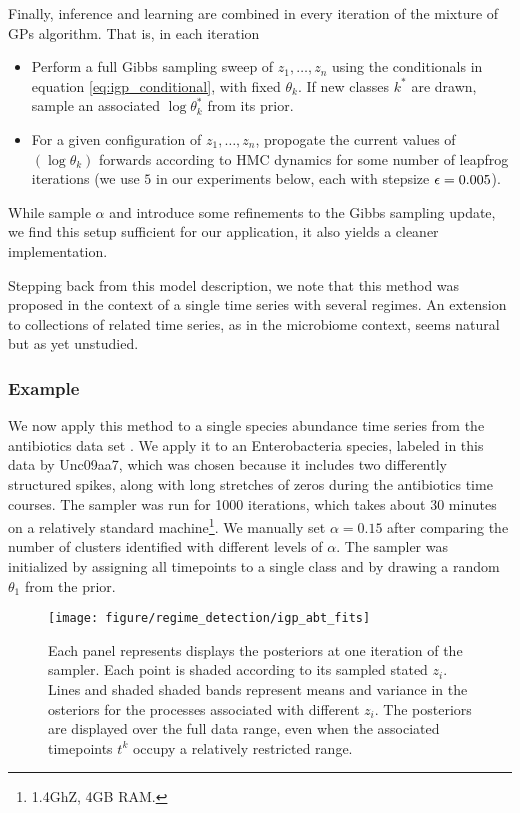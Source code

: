 Finally, inference and learning are combined in every iteration of the mixture
of GPs algorithm. That is, in each iteration
\begin{itemize}
\item Perform a full Gibbs sampling sweep of $z_1, \dots, z_n$ using the
  conditionals in equation \ref{eq:igp_conditional}, with fixed $\theta_k$. If
  new classes $k^\ast$ are drawn, sample an associated $\log \theta_k^\ast$ from
  its prior.
\item For a given configuration of $z_1, \dots, z_n$, propogate the current
  values of $\left(\log \theta_k\right)$ forwards according to HMC dynamics for
  some number of leapfrog iterations (we use $5$ in our experiments below, each
  with stepsize $\epsilon = 0.005$).
\end{itemize}

While \citep{rasmussen2006gaussian} sample $\alpha$ and introduce some
refinements to the Gibbs sampling update, we find this setup sufficient for our
application, it also yields a cleaner implementation.

Stepping back from this model description, we note that this method was
proposed in the context of a single time series with several regimes. An
extension to collections of related time series, as in the microbiome context,
seems natural but as yet unstudied.

\subsubsection{Example}
\label{subsubsec:igp_mix_example}

We now apply this method to a single species abundance time series from the
antibiotics data set \citep{dethlefsen2011incomplete}. We apply it to an
Enterobacteria species, labeled in this data by Unc09aa7, which was chosen
because it includes two differently structured spikes, along with long stretches
of zeros during the antibiotics time courses. The sampler was run for 1000
iterations, which takes about 30 minutes on a relatively standard
machine\footnote{1.4GhZ, 4GB RAM.}. We manually set $\alpha = 0.15$ after
comparing the number of clusters identified with different levels of $\alpha$.
The sampler was initialized by assigning all timepoints to a single class and by
drawing a random $\theta_1$ from the prior.

\begin{figure}
  \centering
  \texttt{[image: figure/regime\_detection/igp\_abt\_fits]}
  \caption{Each panel represents displays the posteriors at one iteration of the
    sampler. Each point is shaded according to its sampled stated $z_i$. Lines
    and shaded shaded bands represent means and variance in the osteriors for
    the processes associated with different $z_i$. The posteriors are displayed
    over the full data range, even when the associated timepoints $t^k$ occupy a
    relatively restricted range. \label{fig:igp_abt_fits}}
\end{figure}

